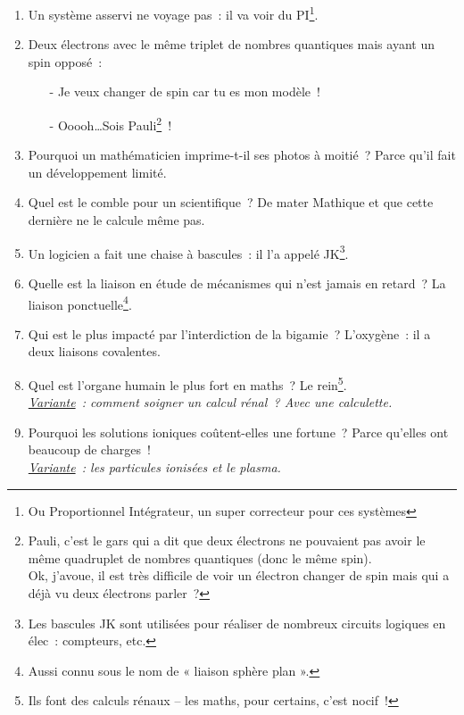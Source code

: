 \documentclass[10pt,a5paper,fullpage]{book}
\begin{document}
\begin{enumerate}
		\item Un système asservi ne voyage pas~: il va voir du PI\footnote{Ou Proportionnel Intégrateur, un super correcteur pour ces systèmes}. 
		\item Deux électrons avec le même triplet de nombres quantiques mais ayant un spin opposé~:
		\begin{itemize}
			\item[-] Je veux changer de spin car tu es mon modèle~!
			\item[-] Ooooh\ldots Sois Pauli\footnote{Pauli, c’est le gars qui a dit que deux électrons ne pouvaient pas avoir le même quadruplet de nombres quantiques (donc le même spin). \\Ok, j’avoue, il est très difficile de voir un électron changer de spin mais qui a déjà vu deux électrons parler~?}~!
		\end{itemize}
		\item Pourquoi un mathématicien imprime-t-il ses photos à moitié~? Parce qu’il fait un développement limité.
		\item Quel est le comble pour un scientifique~? De mater Mathique et que cette dernière ne le calcule même pas.
		\item Un logicien a fait une chaise à bascules~: il l'a appelé JK\footnote{Les bascules JK sont utilisées pour réaliser de nombreux circuits logiques en élec~: compteurs, etc.}.
		\item Quelle est la liaison en étude de mécanismes qui n’est jamais en retard~? La liaison ponctuelle\footnote{Aussi connu sous le nom de « liaison sphère plan ».}.
		\item Qui est le plus impacté par l’interdiction de la bigamie~? L’oxygène~: il a deux liaisons covalentes.
		\item Quel est l’organe humain le plus fort en maths~? Le rein\footnote{Ils font des calculs rénaux -- les maths, pour certains, c’est nocif~!}. \\\textit{\underline{Variante}~: comment soigner un calcul rénal~? Avec une calculette.}
		\item Pourquoi les solutions ioniques coûtent-elles une fortune~? Parce qu’elles ont beaucoup de charges~! \\ \textit{\underline{Variante}~: les particules ionisées et le plasma.}

\end{enumerate}
\end{document}
